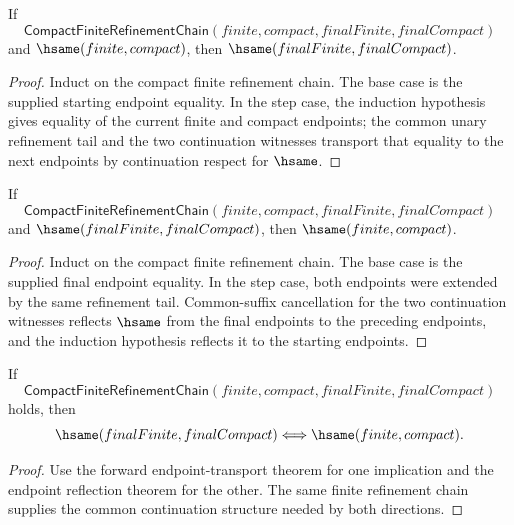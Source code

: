 \begin{theorem}
\label{thm:compact-finite-refinement-chain-endpoint-hsame}
If
$$
\mathsf{CompactFiniteRefinementChain}(finite,compact,finalFinite,finalCompact)
$$
and $\hsame(finite,compact)$, then $\hsame(finalFinite,finalCompact)$.
\end{theorem}
\begin{proof}
Induct on the compact finite refinement chain. The base case is the supplied
starting endpoint equality. In the step case, the induction hypothesis gives
equality of the current finite and compact endpoints; the common unary
refinement tail and the two continuation witnesses transport that equality to
the next endpoints by continuation respect for $\hsame$.
\end{proof}

\begin{theorem}
\label{thm:compact-finite-refinement-chain-endpoint-hsame-reflects}
If
$$
\mathsf{CompactFiniteRefinementChain}(finite,compact,finalFinite,finalCompact)
$$
and $\hsame(finalFinite,finalCompact)$, then $\hsame(finite,compact)$.
\end{theorem}
\begin{proof}
Induct on the compact finite refinement chain. The base case is the supplied
final endpoint equality. In the step case, both endpoints were extended by the
same refinement tail. Common-suffix cancellation for the two continuation
witnesses reflects $\hsame$ from the final endpoints to the preceding endpoints,
and the induction hypothesis reflects it to the starting endpoints.
\end{proof}

\begin{theorem}
\label{thm:compact-finite-refinement-chain-endpoint-hsame-iff}
If
$$
\mathsf{CompactFiniteRefinementChain}(finite,compact,finalFinite,finalCompact)
$$
holds, then
$$
\hsame(finalFinite,finalCompact)\Longleftrightarrow\hsame(finite,compact).
$$
\end{theorem}
\begin{proof}
Use the forward endpoint-transport theorem for one implication and the endpoint
reflection theorem for the other. The same finite refinement chain supplies the
common continuation structure needed by both directions.
\end{proof}

